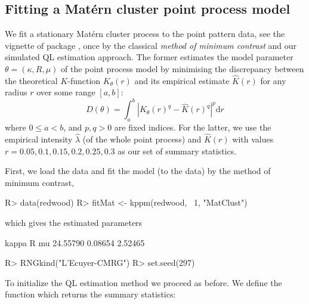 \documentclass[article, nojss]{jss}
\numberwithin{equation}{section}			%
\newcommand\abs[1]{\left|#1\right|}
\begin{document}
\subsection{Fitting a Mat\'{e}rn cluster point process model}
We fit a stationary Mat\'{e}rn cluster process to the  point
pattern data, see the vignette of package  \citep{pkg:spatstat},
once by the classical \emph{method of minimum contrast} and our simulated QL estimation
approach. The former estimates the model parameter $\theta=(\kappa,R,\mu)$ of
the point process model by minimising the discrepancy between the theoretical $K$-function
$K_{\theta}(r)$ and its empirical estimate $\hat{K}(r)$ for any radius $r$ over some range $[a,b]$:
\begin{equation}
  D(\theta) = \int_a^b\abs{K_{\theta}(r)^q-\hat{K}(r)^q}^p \text{d}r
\end{equation}
where $0\leq a<b$, and $p,q>0$ are fixed indices. For the latter, we use the
empirical intensity $\hat{\lambda}$ (of the whole point process) and $\hat{K}(r)$ with
values $r=0.05,0.1,0.15,0.2,0.25,0.3$ as our set of summary statistics.\par
%
First, we load the data and fit the model (to the data) by the method of minimum
contrast,
\begin{Schunk}
\begin{Sinput}
R> data(redwood)
R> fitMat <- kppm(redwood, ~1, "MatClust")
\end{Sinput}
\end{Schunk}
which gives the estimated parameters
\begin{Schunk}
\begin{Soutput}
   kappa        R       mu 
24.55790  0.08654  2.52465 
\end{Soutput}
\end{Schunk}
\begin{Schunk}
\begin{Sinput}
R> RNGkind("L'Ecuyer-CMRG")
R> set.seed(297)
\end{Sinput}
\end{Schunk}
To initialize the QL estimation method we proceed as before. We define the
function which returns the summary statistics:
\begin{Schunk}
\end{Schunk}
\end{document}
